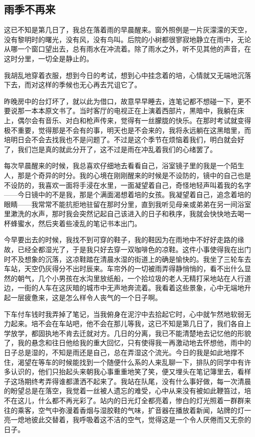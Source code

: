 \subsection{雨季不再来}


\par 这已不知是第几日了，我总在落着雨的早晨醒来。窗外照例是一片灰濛濛的天空，没有黎明时的曙光，没有风，没有鸟叫。后院的小树都很寥寂地静立在雨中，无论从哪一个窗口望出去，总有雨水在冲流着。除了雨水之外，听不见其他的声音，在这时分里，一切全是静止的。
\par 我胡乱地穿着衣服，想到今日的考试，想到心中挂念着的培，心情就又无端地沉落下去，而对这样的季候也无心再去咒诅它了。
\par 昨晚房中的台灯坏了，就以此为借口，故意早早睡去，连笔记都不想碰一下，更不要说那一本本原文书了。当时客厅的电视正在上演着西部片，黑暗中，我躺在床上，偶尔会有音乐、对白和枪声传来，觉得有一丝朦胧的快乐。在那时考试就变得极不重要，觉得那是不会有的事，明天也是不会来的，我将永远躺在这黑暗里，而培明日会不会去找我也不是问题了。不过是这个季节在烦恼着我们，明白就会好了，我们岂是真的就此分开了，这不过是雨在冲乱着我们的心绪罢了。
\par 每次早晨醒来的时候，我总喜欢仔细地去看看自己，浴室镜子里的我是一个陌生人，那是个奇异的时分。我的心境在刚刚醒来的时候是不设防的，镜中的自己也是不设防的，我喜欢一面将手浸在水里，一面凝望着自己，奇怪地轻声叫着我的名字——今日镜中的不是我，那是个满面渴想着培的女孩。我凝望着自己，追念着培的眼睛——我常常不能抗拒地驻留在那时分里，直到我听见母亲或弟弟在另一间浴室里漱洗的水声，那时我会突然记起自己该进入的日子和秩序，我就会快快地去喝一杯蜂蜜水，然后夹着些凌乱的笔记书本出门。
\par 今早要出去的时候，我找不到可穿的鞋子，我的鞋因为在雨地中不好好走路的缘故，已经全都湿光了，于是我只好去穿一双咖啡色的凉鞋。这件小事使得我在出门时不及想象的沉落，这凉鞋踏在清晨水湿的街道上的确是愉快的。我坐了三轮车去车站，天空仍灰得分不出时辰来。车帘外的一切被雨弄得静悄悄的，看不出什么显然的朝气，几个小男孩在水沟里放纸船，一个拾垃圾的老人无精打采地站在人行道边，一街的人车在这灰暗的城市中无声地奔流着。我看着这些景象，心中无端地升起一层疲惫来，这是怎么样令人丧气的一个日子啊。
\par 下车付车钱时我弄掉了笔记，当我俯身在泥泞中去拾起它时，心中就乍然地软弱无力起来。培不会在车站吧，他不会在那儿等我，这已不知是第几日了，我们各自上学放学，都固执地不肯去迁就对方。几日的分离，我已不能清楚地去记忆他的形貌了，我的悬念和往日他给我的重大回忆，只有使得我一再激动地去怀想他，雨中的日子总是湿的，不知是雨还是自己，总在弄湿这个流光。今日的我是如此地撑不住，渴望在等车的时候能找到一个随便什么系的人来乱聊一下，排队的同学中有许多认识的，他们只抬起头来朝我心事重重地笑了笑，便又埋头在笔记簿里去，看样子这场期终考弄得谁都潇洒不起来了。我站在队尾，没有什么事好做，每一次清晨的盼望总是在落空，我觉着一丝被人遗忘的难受，心中从来没有被如此鞭笞过，培不在这儿，什么都不再光彩了。站内的日光灯全都亮着，惨白的灯光照着一群群来往的乘客，空气中弥漫着香烟与湿胶鞋的气味，扩音器在播放着新闻，站牌的灯一亮一熄地彼此交替着，我呼吸着这不洁的空气，觉得这是一个令人厌倦而又无奈的日子。
